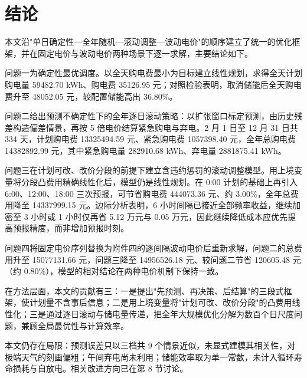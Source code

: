 
\section{结论}

本文沿"单日确定性—全年随机—滚动调整—波动电价"的顺序建立了统一的优化框架，并在固定电价与波动电价两种场景下逐一求解，主要结论如下。

问题一为确定性最优调度。以全天购电费最小为目标建立线性规划，求得全天计划购电量 59482.70 kWh、购电费 35126.95 元；对照检验表明，取消储能后全天购电费升至 48052.05 元，较配置储能高出 36.80\%。

问题二给出预测不确定性下的全年逐日滚动策略：以扩张窗口标定预测，由历史残差构造偏差情景，再按 5 倍电价结算紧急购电与弃电。2 月 1 日至 12 月 31 日共 334 天，计划购电费 13325494.59 元、紧急购电费 1057398.40 元，全年总购电费 14382892.99 元，其中紧急购电量 282910.68 kWh、弃电量 2881875.41 kWh。

问题三在计划可改、改价分段的前提下建立含违约惩罚的滚动调整模型。用上境变量将分段凸费用精确线性化后，模型仍是线性规划。在 0:00 计划的基础上再引入 6:00、12:00、18:00 三次预报，可节省购电费 444073.36 元、约 3.00\%，全年总费用降至 14337999.15 元。边际分析表明，6 小时间隔已接近全部频率收益，继续加密至 3 小时或 1 小时仅再省 5.12 万元与 0.05 万元，因此继续降低成本应优先提高预报精度，而非增加预报时刻。

问题四将固定电价序列替换为附件四的逐间隔波动电价后重新求解，问题二的总费用升至 15077131.66 元，问题三降至 14956526.18 元、较问题二节省 120605.48 元（约 0.80\%），模型的相对结论在两种电价机制下保持一致。

在方法层面，本文的贡献有三：一是提出"先预测、再决策、后结算"的三段式框架，使计划量不含事后信息；二是用上境变量将"计划可改、改价分段"的凸费用线性化；三是通过逐日滚动与储电量传递，把全年大规模优化分解为数百个日尺度问题，兼顾全局最优性与计算效率。

本文仍存在局限：预测误差只以三档共 9 个情景近似，未显式建模其相关性，对极端天气的刻画偏粗；午间弃电尚未利用；储能效率取为单一常数，未计入循环寿命损耗与自放电。相关改进方向已在第 8 节讨论。
